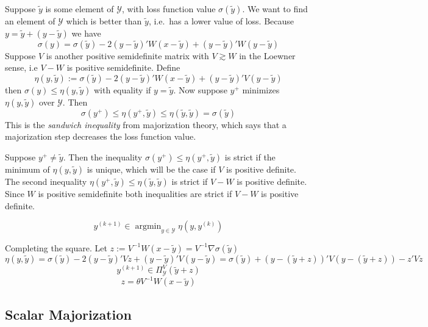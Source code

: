 \documentclass[
  12pt,
  letterpaper,
  DIV=11,
  numbers=noendperiod]{scrartcl}
\begin{document}
Suppose \(\tilde y\) is some element of \(\mathcal{Y}\), with loss
function value \(\sigma(\tilde y)\). We want to find an element of
\(\mathcal{Y}\) which is better than \(\tilde y\), i.e.~has a lower
value of loss. Because \(y=\tilde y+(y-\tilde y)\) we have
\begin{equation}
\sigma(y)=
\sigma(\tilde y)-2(y-\tilde y)'W(x-\tilde y)+(y-\tilde y)'W(y - \tilde y)
\end{equation} Suppose \(V\) is another positive semidefinite matrix
with \(V\gtrsim W\) in the Loewner sense, i.e \(V-W\) is positive
semidefinite. Define \begin{equation}
\eta(y,\tilde y):=
\sigma(\tilde y)-2(y-\tilde y)'W(x-\tilde y)+(y-\tilde y)'V(y - \tilde y)
\end{equation} then \(\sigma(y)\leq\eta(y,\tilde y)\) with equality if
\(y=\tilde y\). Now suppose \(y^+\) minimizes \(\eta(y,\tilde y)\) over
\(\mathcal{Y}\). Then \begin{equation}
\sigma(y^+)\leq\eta(y^+,\tilde y)\leq\eta(\tilde y,\tilde y)=\sigma(\tilde y)
\end{equation} This is the \emph{sandwich inequality} from majorization
theory, which says that a majorization step decreases the loss function
value.

Suppose \(y^+\neq\tilde y\). Then the inequality
\(\sigma(y^+)\leq\eta(y^+,\tilde y)\) is strict if the minimum of
\(\eta(y,\tilde y)\) is unique, which will be the case if \(V\) is
positive definite. The second inequality
\(\eta(y^+,\tilde y)\leq\eta(\tilde y,\tilde y)\) is strict if \(V-W\)
is positive definite. Since \(W\) is positive semidefinite both
inequalities are strict if \(V-W\) is positive definite.

\begin{equation}
y^{(k+1)}\in\mathop{\text{argmin}}_{y\in\mathcal{Y}}\eta(y,y^{(k)})
\end{equation}

Completing the square. Let
\(z:=V^{-1}W(x-\tilde y)=V^{-1}\nabla\sigma(\tilde y)\) \[
\eta(y,\tilde y)=
\sigma(\tilde y)-2(y-\tilde y)'Vz+(y-\tilde y)'V(y - \tilde y)=
\sigma(\tilde y)+(y-(\tilde y+z))'V(y-(\tilde y+z))-z'Vz
\] \[
y^{(k+1)}\in\Pi_{\mathcal{Y}}^V(\tilde y+z)
\] \[
z=\theta V^{-1}W(x-\tilde y)
\]

\subsection{Scalar Majorization}\label{scalar-majorization}
\end{document}
